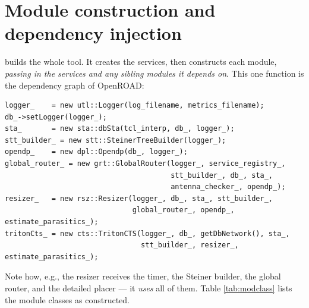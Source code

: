 \section{Module construction and dependency injection}

 builds the whole tool. It creates the services, then
constructs each module, \emph{passing in the services and any sibling modules it
depends on}. This one function is the dependency graph of OpenROAD:

\begin{lstlisting}[style=orcode]
logger_    = new utl::Logger(log_filename, metrics_filename);
db_->setLogger(logger_);
sta_       = new sta::dbSta(tcl_interp, db_, logger_);
stt_builder_ = new stt::SteinerTreeBuilder(logger_);
opendp_    = new dpl::Opendp(db_, logger_);
global_router_ = new grt::GlobalRouter(logger_, service_registry_,
                                       stt_builder_, db_, sta_,
                                       antenna_checker_, opendp_);
resizer_   = new rsz::Resizer(logger_, db_, sta_, stt_builder_,
                              global_router_, opendp_, estimate_parasitics_);
tritonCts_ = new cts::TritonCTS(logger_, db_, getDbNetwork(), sta_,
                                stt_builder_, resizer_, estimate_parasitics_);
\end{lstlisting}

Note how, e.g., the resizer receives the timer, the Steiner builder, the global
router, and the detailed placer --- it \emph{uses} all of them. Table
\ref{tab:modclass} lists the module classes as constructed.

